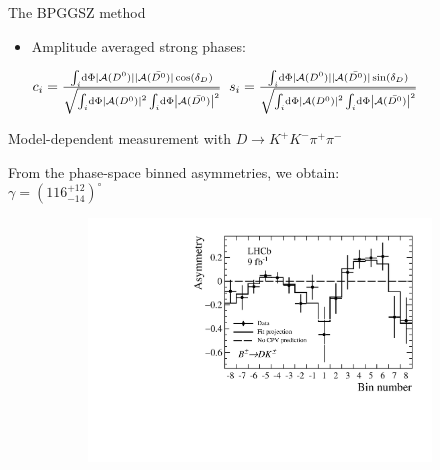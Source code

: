 \documentclass{beamer}
\begin{document}
\begin{frame}{The BPGGSZ method}
  \begin{itemize}
    \item{Amplitude averaged strong phases:}
    \begin{center}
      $c_i = \frac{\int_i\dd{\Phi}|\mathcal{A}(D^0)||\mathcal{A}(\bar{D^0})|\cos(\delta_D)}{\sqrt{\int_i\dd{\Phi}\abs{\mathcal{A}(D^0)}^2\int_i\dd{\Phi}\abs{\mathcal{A}(\bar{D^0})}^2}}$ \quad $s_i = \frac{\int_i\dd{\Phi}|\mathcal{A}(D^0)||\mathcal{A}(\bar{D^0})|\sin(\delta_D)}{\sqrt{\int_i\dd{\Phi}\abs{\mathcal{A}(D^0)}^2\int_i\dd{\Phi}\abs{\mathcal{A}(\bar{D^0})}^2}}$
    \end{center}
  \end{itemize}
\end{frame}

\begin{frame}{Model-dependent measurement with $D\to K^+K^-\pi^+\pi^-$}
  \begin{center}
    \large From the phase-space binned asymmetries, we obtain:\\
    \vspace{0.2cm}
    $\gamma = (116^{+12}_{-14})^\circ$
  \end{center}
  \vspace{-0.2cm}
  \begin{figure}[htb]
    \centering
    \begin{subfigure}{0.5\textwidth}
      \includegraphics[width=1\textwidth]{Plots/BinAsymmetries_dk_ModelDependent.pdf}
    \end{subfigure}%
    \begin{subfigure}{0.5\textwidth}

\end{subfigure}
\end{figure}
\end{frame}
\end{document}
